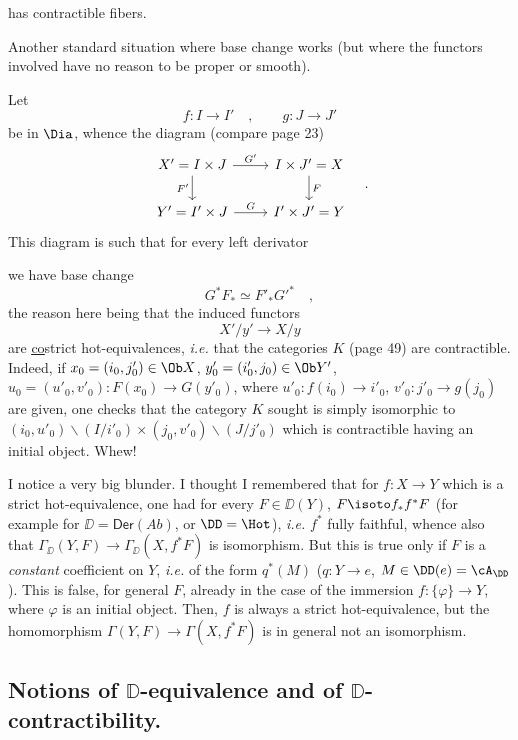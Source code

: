 \noindent has contractible fibers.

Another standard situation where base change works (but where the functors involved have no reason to be proper or smooth).

Let
\[
f : I \longrightarrow I' \quad , \qquad g : J \longrightarrow J'
\]
be in $\Dia$, whence the diagram (compare page 23)
\[
\begin{tikzcd}
X' = I \times J \arrow[r, "G'"] \arrow[d, "F'"'] & I \times J' = X \arrow[d, "F"] \\
Y' = I' \times J \arrow[r, "G"] & I' \times J' = Y
\end{tikzcd}
\quad .
\]
This diagram is such that for every left derivator

\noindent{}

\noindent we have base change
\[
G^*F_* \simeq F'_*{G'}^* \quad ,
\]
the reason here being that the induced functors
\[
X'/y' \longrightarrow X/y
\]
are \underline{\underline{co}}strict hot-equivalences, \textit{i.e.} that the categories $K$ (page 49) are contractible. Indeed, if $x_0 = (i_0, j'_0) \in \Ob X$, $y'_0 = (i'_0, j_0) \in \Ob Y'$, $u_0 = (u'_0, v'_0) : F(x_0) \to G(y'_0)$, where $u'_0 : f(i_0) \to i'_0$, $v'_0 : j'_0 \to g(j_0)$ are given, one checks that the category $K$ sought is simply isomorphic to $(i_0, u'_0)\backslash(I/i'_0) \times (j_0, v'_0)\backslash(J/j'_0)$ which is contractible having an initial object. Whew!

I notice a very big blunder. I thought I remembered that for $f : X \to Y$ which is a strict hot-equivalence, one had for every $F \in \DD(Y)$, $F \isoto f_*f^*F$ (for example for $\DD = \mathsf{Der}(\mathit{Ab})$, or $\DD = \Hot$), \textit{i.e.} $f^*$ fully faithful, whence also that $\Gamma_{\DD}(Y, F) \to \Gamma_{\DD}(X, f^*F)$ is isomorphism. But this is true only if $F$ is a \textit{constant} coefficient on $Y$, \textit{i.e.} of the form $q^*(M)$ ($q : Y \to e$, $M \in \DD(e) = \cA_{\DD}$). This is false, for general $F$, already in the case of the immersion $f : \{\varphi\} \to Y$, where $\varphi$ is an initial object. Then, $f$ is always a strict hot-equivalence, but the homomorphism $\Gamma(Y, F) \to \Gamma(X, f^*F)$ is in general not an isomorphism.

\clearpage
{}
\noindent{}

\subsection*{Notions of $\mathbb{D}$-equivalence and of $\mathbb{D}$-contractibility.}

